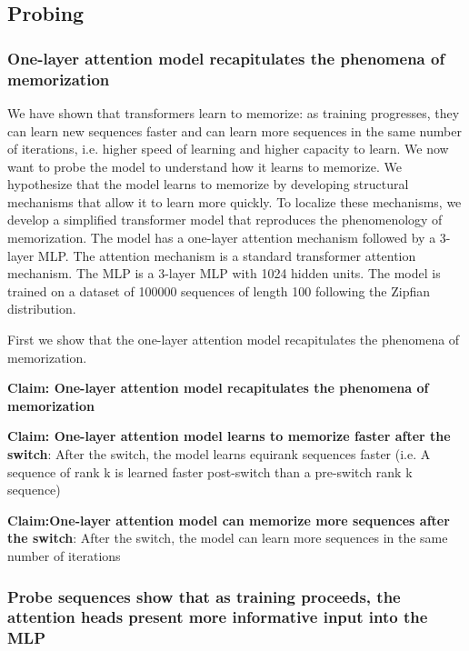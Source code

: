 \documentclass{article}
\theoremstyle{plain}
\theoremstyle{definition}
\theoremstyle{remark}
\begin{document}
\subsection{Probing}
\subsubsection{One-layer attention model recapitulates the phenomena of memorization}

We have shown that transformers learn to memorize: as training progresses, they  
can learn new sequences faster and can learn more sequences in the same number of iterations, i.e. higher 
speed of learning and higher capacity to learn.
We now want to probe the model to understand how it learns to memorize. 
We hypothesize that the model learns to memorize  
by developing structural mechanisms that 
allow it to learn more quickly. 
To localize these mechanisms, we 
develop a simplified transformer model that reproduces the phenomenology of memorization.
The model has a one-layer attention mechanism followed by a 3-layer MLP.
The attention mechanism is a standard transformer attention mechanism.
The MLP is a 3-layer MLP with 1024 hidden units.
The model is trained on a dataset of 100000 sequences of length 100 following the Zipfian distribution.

First we show that the one-layer attention model recapitulates the phenomena of memorization.

\textbf{Claim: One-layer attention model recapitulates the phenomena of memorization}

\textbf{Claim: One-layer attention model learns to memorize faster after the switch}: 
After the switch, the model learns equirank sequences faster 
(i.e. A sequence of rank k is learned faster post-switch than a pre-switch rank k sequence)

\textbf{Claim:One-layer attention model can memorize more sequences after the switch}: 
After the switch, the model can learn more sequences in the same number of iterations

\subsubsection{Probe sequences show that as training proceeds, the attention heads present more informative input into the MLP}
\end{document}
